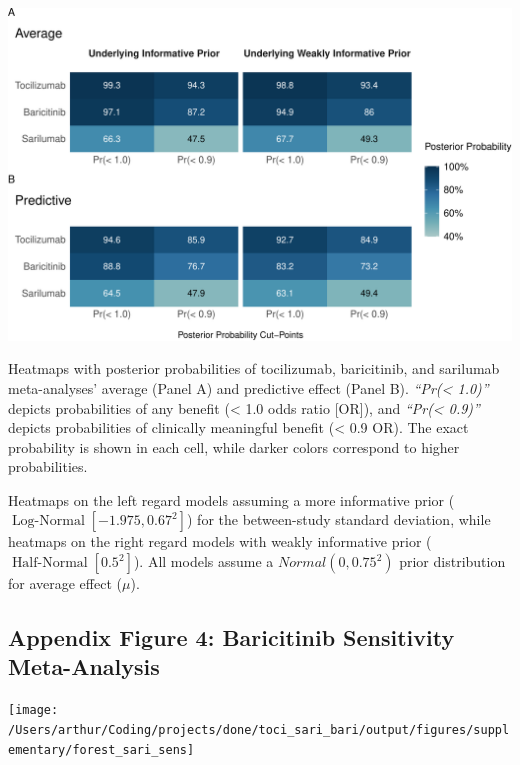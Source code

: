 \documentclass[
  12pt,
]{article}
\begin{document}
\begin{center}\includegraphics{supplementary_material_files/figure-latex/posterior probabilities heatmap-1} \end{center}

Heatmaps with posterior probabilities of tocilizumab, baricitinib, and
sarilumab meta-analyses' average (Panel A) and predictive effect (Panel
B). \emph{``Pr(\textless{} 1.0)''} depicts probabilities of any benefit
(\textless{} 1.0 odds ratio {[}OR{]}), and \emph{``Pr(\textless{}
0.9)''} depicts probabilities of clinically meaningful benefit
(\textless{} 0.9 OR). The exact probability is shown in each cell, while
darker colors correspond to higher probabilities.

Heatmaps on the left regard models assuming a more informative prior
(\(\operatorname{Log-Normal}[-1.975, 0.67^2]\)) for the between-study
standard deviation, while heatmaps on the right regard models with
weakly informative prior (\(\operatorname{Half-Normal}[0.5^2]\)). All
models assume a \(Normal(0, 0.75^2)\) prior distribution for average
effect (\(\mu\)).

\newpage

\hypertarget{appendix-figure-4-baricitinib-sensitivity-meta-analysis}{%
\subsection{Appendix Figure 4: Baricitinib Sensitivity
Meta-Analysis}\label{appendix-figure-4-baricitinib-sensitivity-meta-analysis}}

\begin{center}\texttt{[image: /Users/arthur/Coding/projects/done/toci\_sari\_bari/output/figures/supplementary/forest\_sari\_sens]} \end{center}
\end{document}
